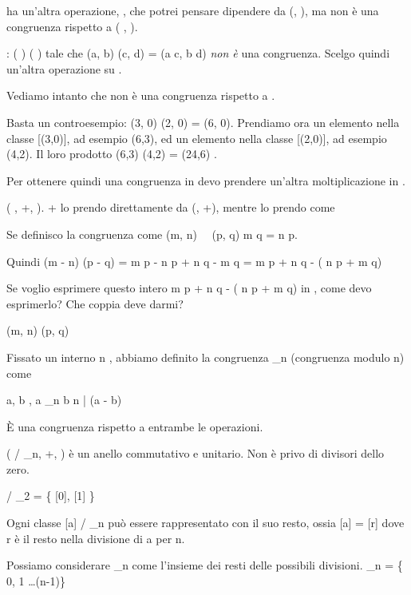  ha un'altra operazione, \cdot, che potrei pensare dipendere da (, \cdot), ma \rho non \`e una congruenza rispetto a ( \times {}, \cdot).

\cdot : ( \times {}) \times ( \times {}) \to {} \times {} tale che (a, b) \cdot (c, d) = (a \cdot c, b \cdot d) \textit{non \`e} una congruenza. Scelgo quindi un'altra operazione \cdot su  \times {}.

Vediamo intanto che \rho non \`e una congruenza rispetto a \cdot.

Basta un controesempio: (3, 0) \cdot (2, 0) = (6, 0). Prendiamo ora un elemento nella classe [(3,0)], ad esempio (6,3), ed un elemento nella classe [(2,0)], ad esempio (4,2). Il loro prodotto (6,3) \cdot (4,2) = (24,6) \in [(18,0)] \neq [(6,0)].

Per ottenere quindi una congruenza in  devo prendere un'altra moltiplicazione in  \times {}.

( \times {}, +, \cdot). + lo prendo direttamente da (, +), mentre \cdot lo prendo come

Se definisco la congruenza come (m, n) \ \rho \ (p, q) \Leftrightarrow m \cdot q = n \cdot p.

Quindi (m - n) (p - q) = m p - n p + n q - m q = m p + n q - ( n p + m q)

Se voglio esprimere questo intero m p + n q - ( n p + m q) in  \times {}, come devo esprimerlo? Che coppia deve darmi?

(m, n) \cdot (p, q) \in [((m p + n q), (n p + m q))]

Fissato un interno n , abbiamo definito la congruenza \equiv_n (congruenza modulo n) come

a, b \in {}, a \equiv_n b \Leftrightarrow n | (a - b)

\`E una congruenza rispetto a entrambe le operazioni.

( / \equiv_n, +, \cdot) \`e un anello commutativo e unitario. Non \`e privo di divisori dello zero.

 / \equiv_2 = \{ [0], [1] \}

Ogni classe [a] \in {} / \equiv_n pu\`o essere rappresentato con il suo resto, ossia [a] = [r] dove r \`e il resto nella divisione di a per n.

Possiamo considerare _n come l'insieme dei resti delle possibili divisioni. _n = \{ 0, 1 \dots (n-1)\}

